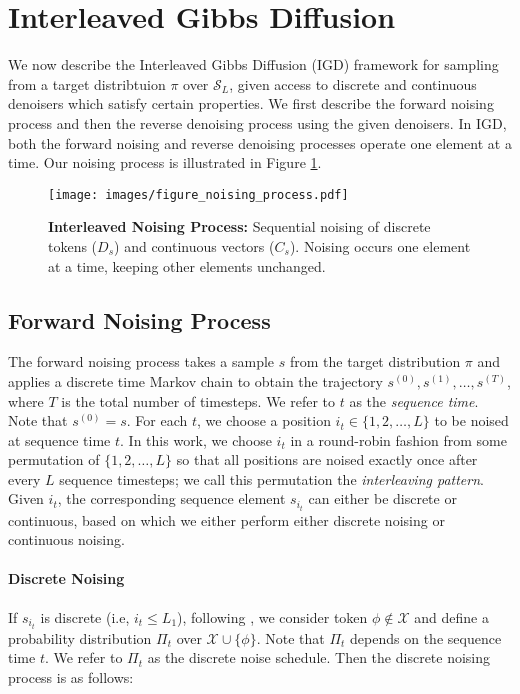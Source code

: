 \section{Interleaved Gibbs Diffusion}
\label{sec:igd}
We now describe the Interleaved Gibbs Diffusion (IGD) framework for sampling from a target distribtuion $\pi$ over $ \mathcal{S}_L$, given access to discrete and continuous denoisers which satisfy certain properties. We first describe the forward noising process and then the reverse denoising process using the given denoisers. In IGD, both the forward noising and reverse denoising processes operate one element at a time. 
Our noising process is illustrated in Figure \ref{fig:noising_process}.

\begin{figure}
    \texttt{[image: images/figure\_noising\_process.pdf]}
    \caption{\textbf{Interleaved Noising Process: } Sequential noising of discrete tokens ($D_s$) and continuous vectors ($C_s$). Noising occurs one element at a time, keeping other elements unchanged.}
    \label{fig:noising_process}
\end{figure}

\subsection{Forward Noising Process} \label{subsec:fnp}
The forward noising process takes a sample $s$ from the target distribution $\pi$ and applies a discrete time Markov chain to obtain the trajectory $s^{(0)},s^{(1)},\dots,s^{(T)}$, where $T$ is the total number of timesteps. We refer to $t$ as the \textit{sequence time}. Note that $s^{(0)} = s$. For each $t$, we choose a position $i_t \in \{1, 2, \dots, L \}$ to be noised at sequence time $t$. In this work, we choose $i_t$ in a round-robin fashion from some permutation of $\{1, 2, \dots, L \}$ so that all positions are noised exactly once after every $L$ sequence timesteps; we call this permutation the \textit{interleaving pattern}. Given $i_t$, the corresponding sequence element $s_{i_t}$ can either be discrete or continuous, based on which we either perform either discrete noising or continuous noising.

\paragraph{Discrete Noising}
If $s_{i_t}$ is discrete (i.e, $i_t \leq L_1$), following \cite{varma2024glauber}, we consider token $\phi \notin \mathcal{X}$ and define a probability distribution $\Pi_t$ over $\mathcal{X} \cup \{\phi\}$. Note that $\Pi_t$ depends on the sequence time $t$. We refer to $\Pi_t$ as the discrete noise schedule. Then the discrete noising process is as follows:

